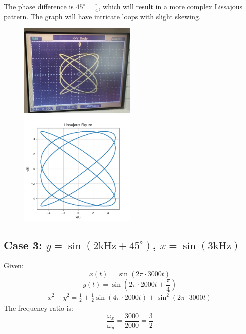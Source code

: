 \documentclass{article}
\begin{document}
The phase difference is \( 45^\circ = \frac{\pi}{4} \), which will result in a more complex Lissajous pattern. The graph will have intricate loops with slight skewing.
\begin{figure}[H]
\centering
\includegraphics[width=0.5\textwidth]{figs/fig2.png}
\includegraphics[width=0.5\textwidth]{figs/fig2_verify.png}
\end{figure}
\subsection{Case 3: $y = \sin(2\text{kHz} + 45^\circ)$, $x = \sin(3\text{kHz})$}

Given:
\[
x(t) = \sin(2\pi \cdot 3000 t)
\]
\[
y(t) = \sin(2\pi \cdot 2000 t + \frac{\pi}{4})
\]
\begin{align*}
x^2 + y^2 = \frac{1}{2} + \frac{1}{2} \sin\left( 4\pi \cdot 2000 t \right) + \sin^2\left( 2\pi \cdot 3000 t \right)
\end{align*}
The frequency ratio is:
\[
\frac{\omega_x}{\omega_y} = \frac{3000}{2000} = \frac{3}{2}
\]
\end{document}
